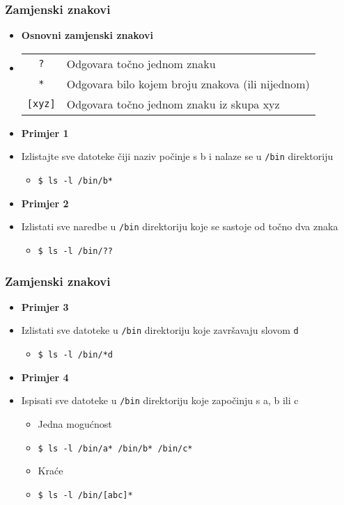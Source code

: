 \documentclass[table,usenames,dvipsnames]{beamer}
\newcommand{\shell}[1]{\texttt{#1}}
\begin{document}
\begin{frame}[t]
\frametitle{Zamjenski znakovi}
\begin{itemize}
	\item[] \textbf{Osnovni zamjenski znakovi}
	\item[] \begin{tabular}{c l}
		\shell{?}   & Odgovara točno jednom znaku\\
		\shell{*}   & Odgovara bilo kojem broju znakova (ili nijednom)\\
		\shell{[xyz]}  & Odgovara točno jednom znaku iz skupa xyz
	\end{tabular}
\end{itemize}
\vfill
\begin{itemize}
	\item \textbf{Primjer 1}
	\item[] Izlistajte sve datoteke čiji naziv počinje s b i nalaze se u \shell{/bin} direktoriju
	\begin{itemize}
		\item[] \shell{\$ ls -l /bin/b*}
	\end{itemize}
\end{itemize}
\vfill
\begin{itemize}
	\item \textbf{Primjer 2}
	\item[] Izlistati sve naredbe u \shell{/bin} direktoriju koje se sastoje od točno dva znaka
	\begin{itemize}
		\item[] \shell{\$ ls -l /bin/??}
	\end{itemize}
\end{itemize}
\end{frame}

\begin{frame}[t]
\frametitle{Zamjenski znakovi}
\begin{itemize}
	\item \textbf{Primjer 3}
	\item[] Izlistati sve datoteke u \shell{/bin} direktoriju koje završavaju slovom \shell{d}
  \begin{itemize}
    \item[] \shell{\$ ls -l /bin/*d}
  \end{itemize}
\end{itemize}
\vfill
\begin{itemize}
	\item \textbf{Primjer 4}
	\item[] Ispisati sve datoteke u \shell{/bin} direktoriju koje započinju s a, b ili c
  \begin{itemize}
    \item Jedna mogućnost
    \item[] \shell{\$ ls -l /bin/a* /bin/b* /bin/c*}
    \item Kraće
    \item[] \shell{\$ ls -l /bin/[abc]*}
  \end{itemize}
\end{itemize}
\vfill
\end{frame}
\end{document}
